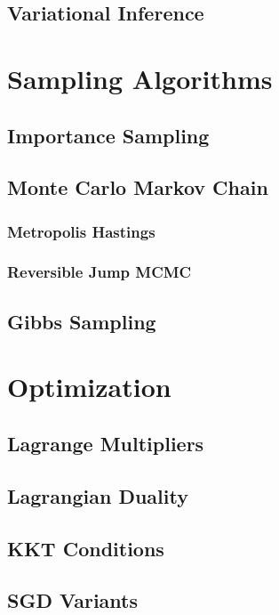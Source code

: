 \documentclass[12pt]{article}
\begin{document}
\subsection{Variational Inference}

\section{Sampling Algorithms}

\subsection{Importance Sampling}

\subsection{Monte Carlo Markov Chain}

\subsubsection{Metropolis Hastings}

\subsubsection{Reversible Jump MCMC}

\subsection{Gibbs Sampling}

\section{Optimization}

\subsection{Lagrange Multipliers}

\subsection{Lagrangian Duality}

\subsection{KKT Conditions}

\subsection{SGD Variants}
\end{document}

